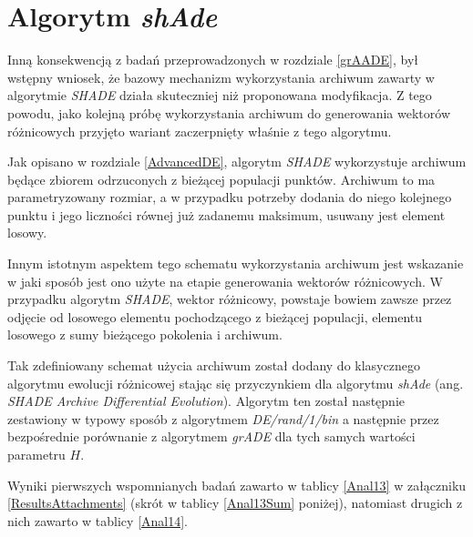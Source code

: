 \documentclass[12pt,a4paper]{report}
\begin{document}
{{{{{{{\section{Algorytm \emph{shAde}}
\par{
Inną konsekwencją z badań przeprowadzonych w rozdziale \ref{grAADE}, był wstępny wniosek, że bazowy mechanizm wykorzystania archiwum zawarty w algorytmie \emph{SHADE} działa skuteczniej niż proponowana modyfikacja. Z tego powodu, jako kolejną próbę wykorzystania archiwum do generowania wektorów różnicowych przyjęto wariant zaczerpnięty właśnie z tego algorytmu.
}
\par{
Jak opisano w rozdziale \ref{AdvancedDE}, algorytm \emph{SHADE} wykorzystuje archiwum będące zbiorem odrzuconych z bieżącej populacji punktów. Archiwum to ma parametryzowany rozmiar, a w przypadku potrzeby dodania do niego kolejnego punktu i jego liczności równej już zadanemu maksimum, usuwany jest element losowy.
}
\par{
Innym istotnym aspektem tego schematu wykorzystania archiwum jest wskazanie w jaki sposób jest ono użyte na etapie generowania wektorów różnicowych. W przypadku algorytm \emph{SHADE}, wektor różnicowy, powstaje bowiem zawsze przez odjęcie od losowego elementu pochodzącego z bieżącej populacji, elementu losowego z sumy bieżącego pokolenia i archiwum.
}
\par{
Tak zdefiniowany schemat użycia archiwum został dodany do klasycznego algorytmu ewolucji różnicowej stając się przyczynkiem dla algorytmu \emph{shAde} (ang. \emph{SHADE Archive Differential Evolution}). Algorytm ten został następnie zestawiony w typowy sposób z algorytmem \emph{DE/rand/1/bin} a następnie przez bezpośrednie porównanie z algorytmem \emph{grADE} dla tych samych wartości parametru $H$.
}
\par{
Wyniki pierwszych wspomnianych badań zawarto w tablicy \ref{Anal13} w załączniku \ref{ResultsAttachments} (skrót w tablicy \ref{Anal13Sum} poniżej), natomiast drugich z nich zawarto w tablicy \ref{Anal14}.
}

}}}}}}}
\end{document}
